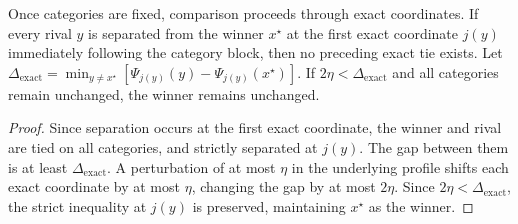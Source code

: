 \begin{theorem}
Once categories are fixed, comparison proceeds through exact coordinates. 
If every rival $y$ is separated from the winner $x^\star$ at the first exact coordinate $j(y)$ immediately following the category block, then no preceding exact tie exists. Let $\Delta_{\mathrm{exact}} = \min_{y \neq x^\star} [\Psi_{j(y)}(y) - \Psi_{j(y)}(x^\star)]$. If $2\eta < \Delta_{\mathrm{exact}}$ and all categories remain unchanged, the winner remains unchanged.
\end{theorem}
\begin{proof}
Since separation occurs at the first exact coordinate, the winner and rival are tied on all categories, and strictly separated at $j(y)$. The gap between them is at least $\Delta_{\mathrm{exact}}$. A perturbation of at most $\eta$ in the underlying profile shifts each exact coordinate by at most $\eta$, changing the gap by at most $2\eta$. Since $2\eta < \Delta_{\mathrm{exact}}$, the strict inequality at $j(y)$ is preserved, maintaining $x^\star$ as the winner.
\end{proof}
